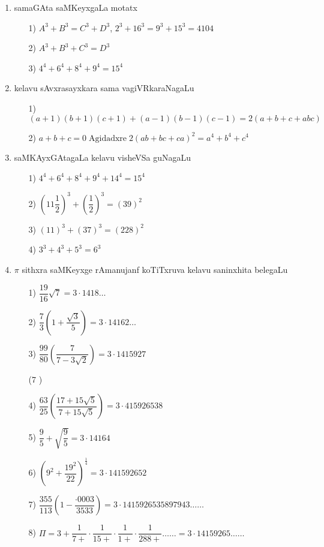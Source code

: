 \begin{enumerate}[{\rm I}]
\item samaGAta saMKeyxgaLa motatx
\begin{itemize}
\item[{\rm 1)}] $A^{3}+B^{3} = C^{3}+D^{3}$,
$2^{3}+16^{3} = 9^{3}+15^{3} = 4104$
\item[{\rm 2)}] $A^{3}+B^{3}+C^{3}=D^{3}$
\item[{\rm 3)}] $4^{4}+6^{4}+8^{4}+9^{4} = 15^{4}$
\end{itemize}

\item kelavu sAvxrasayxkara sama vagiVRkaraNagaLu
\begin{itemize}
\item[{\rm 1)}] $(a+1)(b+1)(c+1)+(a-1)(b-1)(c-1)=2(a+b+c+abc)$
\item[{\rm 2)}] $a+b+c=0 \; \text{Agidadxre} \; 2(ab+bc+ca)^{2} = a^{4}+b^{4}+c^{4}$
\end{itemize}

\item saMKAyxGAtagaLa kelavu visheVSa guNagaLu
\begin{itemize}
\item[{\rm 1)}] $4^{4}+6^{4}+8^{4}+9^{4}+14^{4} = 15^{4}$
\item[{\rm 2)}] $\left(11\dfrac{1}{2}\right)^{3}+\left(\dfrac{1}{2}\right)^{3} = (39)^{2}$
\item[{\rm 3)}] $(11)^{3}+(37)^{3} = (228)^{2}$
\item[{\rm 4)}] $3^{3}+4^{3}+5^{3} = 6^{3}$
\end{itemize}
\newpage

\item $\pi$ sithxra saMKeyxge rAmanujanf koTiTxruva kelavu saninxhita belegaLu
\begin{itemize}
\itemsep=6pt
\item[{\rm 1)}] $\dfrac{19}{16}\sqrt{7}=3\cdot 1418\ldots$
\item[{\rm 2)}] $\dfrac{7}{3} \left(1+\dfrac{\sqrt{3}}{5} \right)=3\cdot 14162\ldots$
\item[{\rm 3)}] $\dfrac{99}{80} \left(\dfrac{7}{7-3\sqrt{2}} \right)= 3\cdot 1415927$

({\rm 7} )
\item[{\rm 4)}] $\dfrac{63}{25} \left(\dfrac{17+15\sqrt{5}}{7+15\sqrt{5}}\right) = 3\cdot 415926538$
\item[{\rm 5)}] $\dfrac{9}{5}+\sqrt{\dfrac{9}{5}}=3\cdot 14164$
\item[{\rm 6)}] $\left(9^{2}+\dfrac{19^{2}}{22} \right)^{\frac{1}{4}}=3\cdot 14 1592652$
\item[{\rm 7)}] $\dfrac{355}{113} \left(1-\dfrac{\cdot0003}{3533}\right)=3\cdot 1415926535897943\ldots\ldots$
\item[{\rm 8)}] $\Pi=3+\dfrac{1}{7+}\cdot \dfrac{1}{15+}\cdot \dfrac{1}{1+}\cdot \dfrac{1}{288+}\ldots\ldots=3\cdot 14 159265\ldots\ldots$
\end{itemize}
\vskip -3pt


\end{enumerate}

